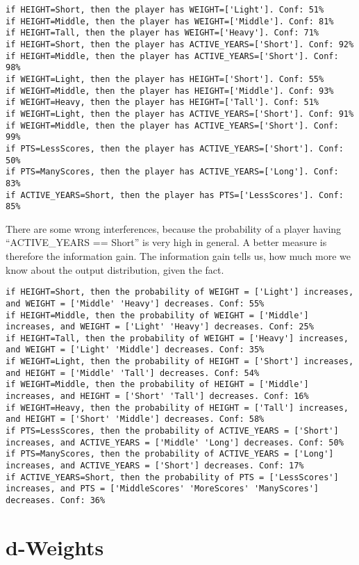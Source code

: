 \documentclass{article}
\begin{document}
\begin{lstlisting}
if HEIGHT=Short, then the player has WEIGHT=['Light']. Conf: 51%
if HEIGHT=Middle, then the player has WEIGHT=['Middle']. Conf: 81%
if HEIGHT=Tall, then the player has WEIGHT=['Heavy']. Conf: 71%
if HEIGHT=Short, then the player has ACTIVE_YEARS=['Short']. Conf: 92%
if HEIGHT=Middle, then the player has ACTIVE_YEARS=['Short']. Conf: 98%
if WEIGHT=Light, then the player has HEIGHT=['Short']. Conf: 55%
if WEIGHT=Middle, then the player has HEIGHT=['Middle']. Conf: 93%
if WEIGHT=Heavy, then the player has HEIGHT=['Tall']. Conf: 51%
if WEIGHT=Light, then the player has ACTIVE_YEARS=['Short']. Conf: 91%
if WEIGHT=Middle, then the player has ACTIVE_YEARS=['Short']. Conf: 99%
if PTS=LessScores, then the player has ACTIVE_YEARS=['Short']. Conf: 50%
if PTS=ManyScores, then the player has ACTIVE_YEARS=['Long']. Conf: 83%
if ACTIVE_YEARS=Short, then the player has PTS=['LessScores']. Conf: 85%
\end{lstlisting}
There are some wrong interferences, because the probability of a player having ``ACTIVE\_YEARS == Short'' is very high in general.
A better measure is therefore the information gain.
The information gain tells us, how much more we know about the output distribution, given the fact.
\begin{lstlisting}
if HEIGHT=Short, then the probability of WEIGHT = ['Light'] increases, and WEIGHT = ['Middle' 'Heavy'] decreases. Conf: 55%
if HEIGHT=Middle, then the probability of WEIGHT = ['Middle'] increases, and WEIGHT = ['Light' 'Heavy'] decreases. Conf: 25%
if HEIGHT=Tall, then the probability of WEIGHT = ['Heavy'] increases, and WEIGHT = ['Light' 'Middle'] decreases. Conf: 35%
if WEIGHT=Light, then the probability of HEIGHT = ['Short'] increases, and HEIGHT = ['Middle' 'Tall'] decreases. Conf: 54%
if WEIGHT=Middle, then the probability of HEIGHT = ['Middle'] increases, and HEIGHT = ['Short' 'Tall'] decreases. Conf: 16%
if WEIGHT=Heavy, then the probability of HEIGHT = ['Tall'] increases, and HEIGHT = ['Short' 'Middle'] decreases. Conf: 58%
if PTS=LessScores, then the probability of ACTIVE_YEARS = ['Short'] increases, and ACTIVE_YEARS = ['Middle' 'Long'] decreases. Conf: 50%
if PTS=ManyScores, then the probability of ACTIVE_YEARS = ['Long'] increases, and ACTIVE_YEARS = ['Short'] decreases. Conf: 17%
if ACTIVE_YEARS=Short, then the probability of PTS = ['LessScores'] increases, and PTS = ['MiddleScores' 'MoreScores' 'ManyScores'] decreases. Conf: 36%
\end{lstlisting}

\section{d-Weights}


\end{document}
